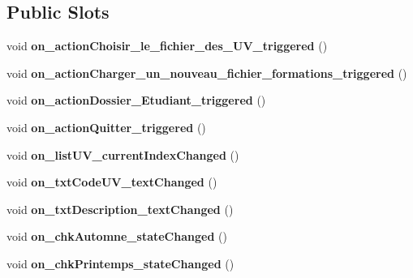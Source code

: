 \subsection*{Public Slots}
\begin{DoxyCompactItemize}
\item 
\hypertarget{class_main_window_aceb6eba1c65888d08f243d2b28807598}{void {\bfseries on\+\_\+action\+Choisir\+\_\+le\+\_\+fichier\+\_\+des\+\_\+\+U\+V\+\_\+triggered} ()}\label{class_main_window_aceb6eba1c65888d08f243d2b28807598}

\item 
\hypertarget{class_main_window_af778a098b79c929ae29486be827192af}{void {\bfseries on\+\_\+action\+Charger\+\_\+un\+\_\+nouveau\+\_\+fichier\+\_\+formations\+\_\+triggered} ()}\label{class_main_window_af778a098b79c929ae29486be827192af}

\item 
\hypertarget{class_main_window_a94b47d9008454ea1c0911d4c74de780a}{void {\bfseries on\+\_\+action\+Dossier\+\_\+\+Etudiant\+\_\+triggered} ()}\label{class_main_window_a94b47d9008454ea1c0911d4c74de780a}

\item 
\hypertarget{class_main_window_afe9d9d46e61e2460e636619577a9e8fd}{void {\bfseries on\+\_\+action\+Quitter\+\_\+triggered} ()}\label{class_main_window_afe9d9d46e61e2460e636619577a9e8fd}

\item 
\hypertarget{class_main_window_adffb9d15a6eefe9d5c6296fc57e6aeab}{void {\bfseries on\+\_\+list\+U\+V\+\_\+current\+Index\+Changed} ()}\label{class_main_window_adffb9d15a6eefe9d5c6296fc57e6aeab}

\item 
\hypertarget{class_main_window_a858a38f003089560d1c8c2506a7cc8c7}{void {\bfseries on\+\_\+txt\+Code\+U\+V\+\_\+text\+Changed} ()}\label{class_main_window_a858a38f003089560d1c8c2506a7cc8c7}

\item 
\hypertarget{class_main_window_ae48298b981c4dcbd136c228a2b0343af}{void {\bfseries on\+\_\+txt\+Description\+\_\+text\+Changed} ()}\label{class_main_window_ae48298b981c4dcbd136c228a2b0343af}

\item 
\hypertarget{class_main_window_af96bb132d657e4795f0d9e9ea31af6ad}{void {\bfseries on\+\_\+chk\+Automne\+\_\+state\+Changed} ()}\label{class_main_window_af96bb132d657e4795f0d9e9ea31af6ad}

\item 
\hypertarget{class_main_window_a0033bd1e6cdcd07e7e395a12665735c6}{void {\bfseries on\+\_\+chk\+Printemps\+\_\+state\+Changed} ()}\label{class_main_window_a0033bd1e6cdcd07e7e395a12665735c6}


\end{DoxyCompactItemize}
